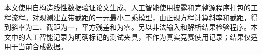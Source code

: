 本文使用自构造线性数据验证论文生成、人工智能使用披露和完整源程序打包的工程流程。对观测建立带截距的一元最小二乘模型，由正规方程计算斜率和截距，得到斜率为二、截距为一，平方残差和为零。另以非法输入和解析结果检验程序。本文中的人工智能记录为明确标记的测试夹具，不作为真实竞赛使用记录；结果仅适用于当前合成数据。
